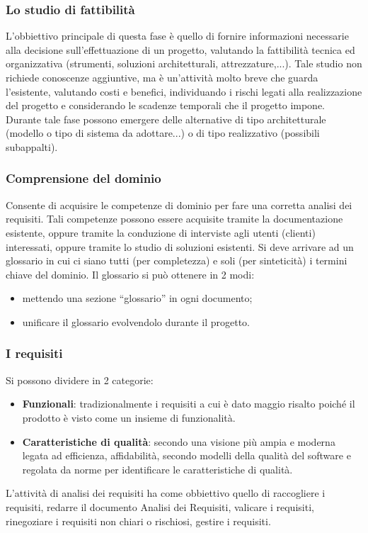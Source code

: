 \subsubsection{Lo studio di fattibilità}
L'obbiettivo principale di questa fase è quello di fornire informazioni necessarie alla decisione sull'effettuazione di un progetto, valutando la fattibilità tecnica ed organizzativa (strumenti, soluzioni architetturali, attrezzature,...).
Tale studio non richiede conoscenze aggiuntive, ma è un'attività molto breve che guarda l'esistente, valutando costi e benefici, individuando i rischi legati alla realizzazione del progetto e considerando le scadenze temporali che il progetto impone. 
Durante tale fase possono emergere delle alternative di tipo architetturale (modello o tipo di sistema da adottare...) o di tipo realizzativo (possibili subappalti).

\subsubsection{Comprensione del dominio}
Consente di acquisire le competenze di dominio per fare una corretta analisi dei requisiti. 
Tali competenze possono essere acquisite tramite la documentazione esistente, oppure tramite la conduzione di interviste agli utenti (clienti) interessati, oppure tramite lo studio di soluzioni esistenti.
Si deve arrivare ad un glossario in cui ci siano tutti (per completezza) e soli (per sinteticità) i termini chiave del dominio. 
Il glossario si può ottenere in 2 modi:
\begin{itemize}
\item mettendo una sezione ``glossario'' in ogni documento;
\item unificare il glossario evolvendolo durante il progetto.
\end{itemize}

\subsubsection{I requisiti}
Si possono dividere in 2 categorie:
\begin{itemize}
\item \textbf{Funzionali}: tradizionalmente i requisiti a cui è dato maggio risalto poiché il prodotto è visto come un insieme di funzionalità.
\item \textbf{Caratteristiche di qualità}: secondo una visione più ampia e moderna legata ad efficienza, affidabilità, secondo modelli della qualità del software e regolata da norme per identificare le caratteristiche di qualità.
\end{itemize}
L'attività di analisi dei requisiti ha come obbiettivo quello di raccogliere i requisiti, redarre il documento Analisi dei Requisiti, valicare i requisiti, rinegoziare i requisiti non chiari o rischiosi, gestire i requisiti.

